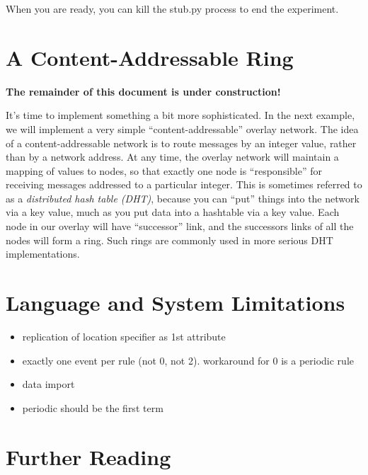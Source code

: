 \documentclass{article}
\begin{document}
When you are ready, you can kill the stub.py process to end the
experiment.

\section{A Content-Addressable Ring}
{\bf The remainder of this document is under construction!}

It's time to implement something a bit more sophisticated.  In the
next example, we will implement a very simple ``content-addressable''
overlay network.  The idea of a content-addressable network is to
route messages by an integer value, rather than by a network address.
At any time, the overlay network will maintain a mapping of values to
nodes, so that exactly one node is ``responsible'' for receiving
messages addressed to a particular integer.  This is sometimes
referred to as a {\em distributed hash table (DHT)}, because you can
``put'' things into the network via a key value, much as you put data
into a hashtable via a key value.  Each node in our overlay will have
``successor'' link, and the successors links of all the nodes will
form a ring.  Such rings are commonly used in more serious DHT
implementations.




\section{Language and System Limitations}
\begin{itemize}
\item replication of location specifier as 1st attribute
\item exactly one event per rule (not 0, not 2).  workaround for 0 is
      a periodic rule
\item data import
\item periodic should be the first term
\end{itemize}
\section{Further Reading}
\end{document}
